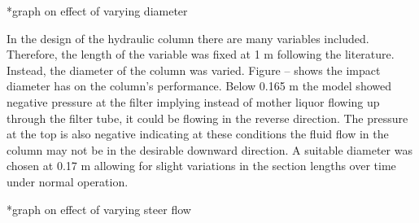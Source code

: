 *graph on effect of varying diameter 

In the design of the hydraulic column there are many variables included. Therefore, the length of the variable was fixed at 1 m following the literature. Instead, the diameter of the column was varied. Figure -- shows the impact diameter has on the column's performance. Below 0.165 m the model showed negative pressure at the filter implying instead of mother liquor flowing up through the filter tube, it could be flowing in the reverse direction. The pressure at the top is also negative indicating at these conditions the fluid flow in the column may not be in the desirable downward direction. A suitable diameter was chosen at 0.17 m allowing for slight variations in the section lengths over time under normal operation. 

*graph on effect of varying steer flow 

